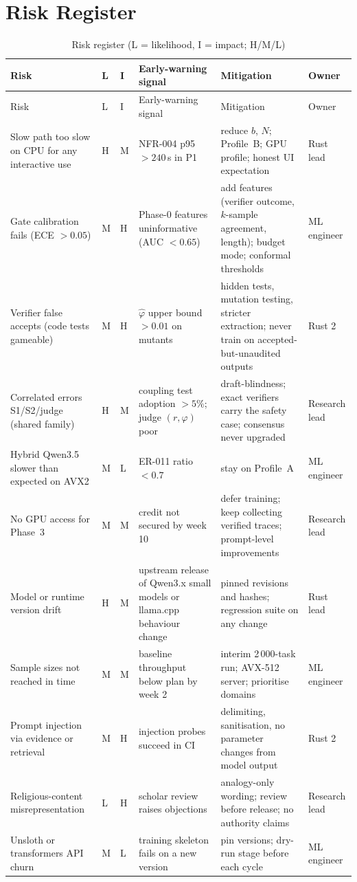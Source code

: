 \documentclass[11pt,a4paper]{article}
\begin{document}
\section{Risk Register}
\begin{longtable}{@{}p{2.8cm}p{0.6cm}p{0.6cm}p{3.0cm}p{4.6cm}p{1.8cm}@{}}
\caption{Risk register (L = likelihood, I = impact; H/M/L)}\\
\toprule Risk & L & I & Early-warning signal & Mitigation & Owner\\\midrule\endfirsthead
\toprule Risk & L & I & Early-warning signal & Mitigation & Owner\\\midrule\endhead\bottomrule\endfoot
Slow path too slow on CPU for any interactive use & H & M & NFR-004 p95 $>240$\,s in P1 & reduce $b$, $N$; Profile~B; GPU profile; honest UI expectation & Rust lead\\
Gate calibration fails (ECE $>0.05$) & M & H & Phase-0 features uninformative (AUC $<0.65$) & add features (verifier outcome, $k$-sample agreement, length); budget mode; conformal thresholds & ML engineer\\
Verifier false accepts (code tests gameable) & M & H & $\hat\varphi$ upper bound $>0.01$ on mutants & hidden tests, mutation testing, stricter extraction; never train on accepted-but-unaudited outputs & Rust 2\\
Correlated errors S1/S2/judge (shared family) & H & M & coupling test adoption $>5\%$; judge $(r,\varphi)$ poor & draft-blindness; exact verifiers carry the safety case; consensus never upgraded & Research lead\\
Hybrid Qwen3.5 slower than expected on AVX2 & M & L & ER-011 ratio $<0.7$ & stay on Profile~A & ML engineer\\
No GPU access for Phase~3 & M & M & credit not secured by week 10 & defer training; keep collecting verified traces; prompt-level improvements & Research lead\\
Model or runtime version drift & H & M & upstream release of Qwen3.x small models or llama.cpp behaviour change & pinned revisions and hashes; regression suite on any change & Rust lead\\
Sample sizes not reached in time & M & M & baseline throughput below plan by week 2 & interim 2\,000-task run; AVX-512 server; prioritise domains & ML engineer\\
Prompt injection via evidence or retrieval & M & H & injection probes succeed in CI & delimiting, sanitisation, no parameter changes from model output & Rust 2\\
Religious-content misrepresentation & L & H & scholar review raises objections & analogy-only wording; review before release; no authority claims & Research lead\\
Unsloth or transformers API churn & M & L & training skeleton fails on a new version & pin versions; dry-run stage before each cycle & ML engineer\\
\end{longtable}
\end{document}
